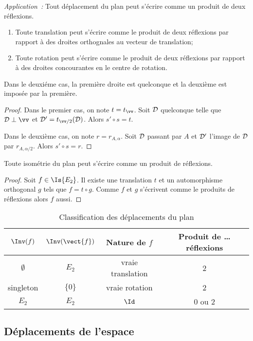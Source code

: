\emph{Application~:} Tout déplacement du plan peut s'écrire comme un produit de deux réflexions.
\begin{enumerate}
\item Toute translation peut s'écrire comme le produit de deux réflexions par rapport à des droites orthognales au vecteur de translation;
\item Toute rotation peut s'écrire comme le produit de deux réflexions par rapport à des droites concourantes en le centre de rotation.
\end{enumerate}

Dans le deuxiéme cas, la première droite est quelconque et la deuxième est imposée par la première.

\begin{proof}
  Dans le premier cas, on note $t=t_{\vv}$. Soit $\mathcal{D}$ quelconque telle que $\Dr \perp \vv$ et $\Dr'=t_{\vv/2}(\Dr)$. Alors $s'\circ s=t$.

  Dans le deuxième cas, on note $r=r_{A, \alpha}$. Soit $\mathcal{D}$ passant par $A$ et $\mathcal{D}'$ l'image de $\mathcal{D}$ par $r_{A,\alpha/2}$. Alors $s'\circ s=r$.
\end{proof}

\begin{cor}
  Toute isométrie du plan peut s'écrire comme un produit de réflexions.
\end{cor}
\begin{proof}
  Soit $f \in \Is{E_2}$. Il existe une translation $t$ et un automorphisme orthogonal $g$ tels que $f=t \circ g$. Comme $f$ et $g$ s'écrivent comme le produits de réflexions alors $f$ aussi.
\end{proof}

\begin{table}
  \centering
  \begin{tabular}{|c|c|c|c|}\hline
    $\Inv(f)$ & $\Inv(\vect{f})$ & Nature de $f$ & Produit de \ldots réflexions \\ \hline
    $\emptyset$ & $E_2$ & vraie translation & 2 \\
    singleton & $\{0\}$& vraie rotation & 2 \\
    $E_2$ & $E_2$ & $\Id$ & 0 ou 2 \\ \hline
  \end{tabular}
  \caption{Classification des déplacements du plan}
  \label{tab:classdéplacementsplan}
\end{table}

\subsection{Déplacements de l'espace}

